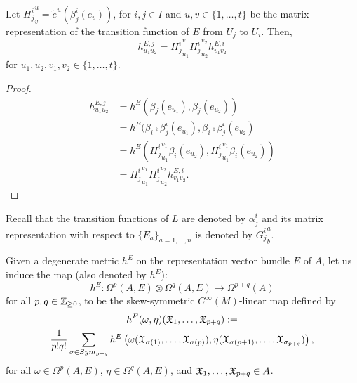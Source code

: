 \begin{proposition}\label{propositionTransformationLawMetricHGeneralBUndleRepresentation}
Let ${H^i_j}^u_v = \tilde e^u(\beta^i_j(e_v))$, for $i, j \in I$ and $u, v \in \{1, \dots, t\}$ be the matrix representation of the transition function of $E$ from $U_j$ to $U_i$. Then,
\begin{equation}
    h^{E, j}_{u_1 u_2} = {H^i_j}^{v_1}_{u_1}{H^i_j}^{v_2}_{u_2} h^{E, i}_{v_1 v_2}
\end{equation}
for $u_1, u_2, v_1, v_2 \in \{1, \dots, t\}$.
\end{proposition}
\begin{proof}
\begin{align*}
    h^{E, j}_{u_1 u_2} 
        &= h^E(\beta_j(e_{u_1}),\beta_j(e_{u_2})) \\
        &= h^E(\beta_i \comp \beta^i_j(e_{u_1}), \beta_i \comp \beta^i_j(e_{u_2})\\
        &= h^E({H^i_j}^{v_1}_{u_1} \beta_i(e_{u_2}), {H^i_j}^{v_1}_{u_1} \beta_i(e_{u_2}))\\
        &= {H^i_j}^{v_1}_{u_1}{H^i_j}^{v_2}_{u_2} h^{E, i}_{v_1 v_2}.
\end{align*}
\end{proof}
Recall that the transition functions of $L$ are denoted by $\alpha^i_j$ and its matrix representation with respect to $\{E_a\}_{a = 1, \dots, n}$ is denoted by ${G^i_j}^a_b$.

\begin{definition}
    Given a degenerate metric $h^E$ on the representation vector bundle $E$ of $A$, let us induce the map (also denoted by $h^E$):
    \begin{equation}
        h^E: \Omega^p(A, E) \otimes \Omega^q(A, E) \to \Omega^{p+q}(A)
    \end{equation}
    for all $p, q \in \mathbb{Z}_{\geq 0}$, to be the skew-symmetric $C^\infty(M)$-linear map defined by
    \begin{multline}
        h^E(\omega, \eta)(\mathfrak{X}_1, \dots, \mathfrak{X}_{p+q}) :=\\ \frac{1}{p!q!} \sum_{\sigma \in Sym_{p+q}} 
        h^E\left( \omega(\mathfrak{X}_{\sigma(1)}, \dots, \mathfrak{X}_{\sigma(p)}),  \eta(\mathfrak{X}_{\sigma(p+1)}, \dots, \mathfrak{X}_{\sigma_{p+q}}) \right),
    \end{multline}
    for all $\omega \in \Omega^p(A, E)$, $\eta \in \Omega^q(A, E)$, and $\mathfrak{X}_1, \dots, \mathfrak{X}_{p+q} \in A$.
\end{definition}

